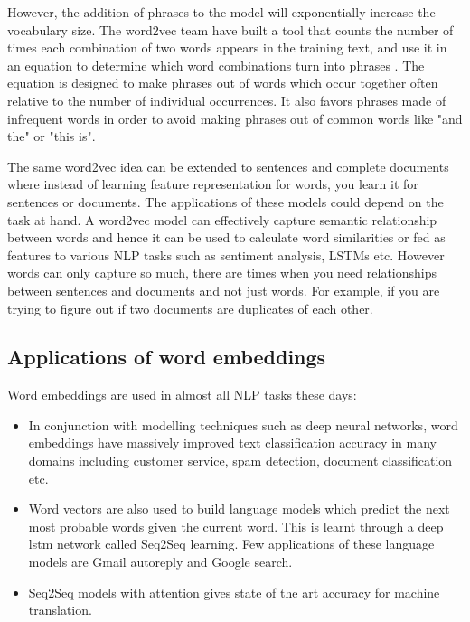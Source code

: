 However, the addition of phrases to the model will exponentially increase the vocabulary size. The word2vec team have built a tool that counts the number of times each combination of two words appears in the training text, and use it in an equation to determine which word combinations turn into phrases \cite{mikolov2013distributed}. The equation is designed to make phrases out of words which occur together often relative to the number of individual occurrences. It also favors phrases made of infrequent words in order to avoid making phrases out of common words like "and the" or "this is".

The same word2vec idea can be extended to sentences and complete documents where instead of learning feature representation for words, you learn it for sentences or documents. The applications of these models could depend on the task at hand. A word2vec model can effectively capture semantic relationship between words and hence it can be used to calculate word similarities or fed as features to various NLP tasks such as sentiment analysis, LSTMs etc. However words can only capture so much, there are times when you need relationships between sentences and documents and not just words. For example, if you are trying to figure out if two documents are duplicates of each other.

\subsection{Applications of word embeddings}

Word embeddings are used in almost all NLP tasks these days:

\begin{itemize}
\item In conjunction with modelling techniques such as deep neural networks, word embeddings have massively improved text classification accuracy in many domains including customer service, spam detection, document classification etc.

\item Word vectors are also used to build language models which predict the next most probable words given the current word. This is learnt through a deep lstm network called Seq2Seq learning. Few applications of these language models are Gmail autoreply and Google search.

\item Seq2Seq models with attention gives state of the art accuracy for machine translation.
\end{itemize}

